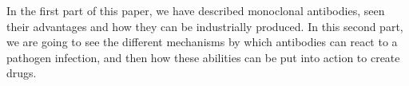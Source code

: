 In the first part of this paper, we have described monoclonal
antibodies, seen their advantages and how they
can be industrially produced. In this second part, we are going
to see the different mechanisms by which antibodies can react to 
a pathogen infection, and then how these abilities can be put
into action to create drugs.